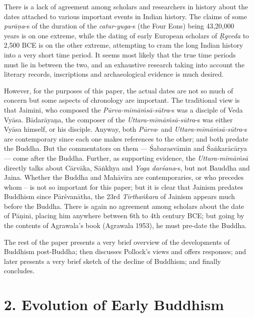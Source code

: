There is a lack of agreement among scholars and researchers in history about the dates attached to various important events in Indian history. The claims of some \textit{purāṇa}-s of the duration of the \textit{catur-yuga}-s (the Four Eons) being 43,20,000 years is on one extreme, while the dating of early European scholars of \textit{Ṛgveda} to 2,500 BCE is on the other extreme, attempting to cram the long Indian history into a very short time period. It seems most likely that the true time periods must lie in between the two, and an exhaustive research taking into account the literary records, inscriptions and archaeological evidence is much desired.

However, for the purposes of this paper, the actual dates are not so much of concern but some aspects of chronology are important. The traditional view is that Jaimini, who composed the \textit{Pūrva-mīmāṁsā-sūtra}-s was a disciple of Veda Vyāsa. Bādarāyaṇa, the composer of the \textit{Uttara-mīmāṁsā-sūtra}-s was either Vyāsa himself, or his disciple. Anyway, both \textit{Pūrva}- and \textit{Uttara-mīmāṁsā-sūtra}-s are contemporary since each one makes references to the other; and both predate the Buddha. But the commentators on them — Śabarasvāmin and Śaṅkarācārya — come after the Buddha. Further, as supporting evidence, the \textit{Uttara-mīmāṁsā} directly talks about Cārvāka, Sāṅkhya and \textit{Yoga darśana}-s, but not Bauddha and Jaina. Whether the Buddha and Mahāvīra are contemporaries, or who precedes whom – is not so important for this paper; but it is clear that Jainism predates Buddhism since Pārśvanātha, the 23rd \textit{Tīrthaṅkara} of Jainism appears much before the Buddha. There is again no agreement among scholars about the date of Pāṇini, placing him anywhere between 6th to 4th century BCE; but going by the contents of Agrawala’s book (Agrawala 1953), he must pre-date the Buddha.

The rest of the paper presents a very brief overview of the developments of Buddhism post-Buddha; then discusses Pollock’s views and offers responses; and later presents a very brief sketch of the decline of Buddhism; and finally concludes.


\section*{2. Evolution of Early Buddhism}


